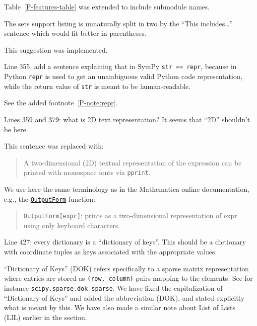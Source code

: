\documentclass[answers,12pt]{exam}
\begin{document}
\begin{questions}
\begin{solution}
Table~\ref{P-features-table} was extended to include submodule names.
\end{solution}

\question The sets support listing is unnaturally split in two by the ``This includes\ldots'' sentence which would fit better in parentheses.
\begin{solution}
This suggestion was implemented.
\end{solution}

\question Line 355, add a sentence explaining that in SymPy \texttt{str == repr}, because in Python \texttt{repr} is used to get an unambiguous valid Python code representation, while the return value of \texttt{str} is meant to be human-readable.
\begin{solution}
See the added footnote~\ref{P-note:repr}.
\end{solution}

\question Lines 359 and 379: what is 2D text representation? It seems that ``2D'' shouldn't be here.
\begin{solution}
This sentence was replaced with:
\begin{quote}
A two-dimensional (2D) textual representation of the expression can
be printed with monospace fonts via \verb|pprint|.
\end{quote}
We use here the same terminology as in the Mathematica
online documentation, e.g., the
\href{https://reference.wolfram.com/language/ref/OutputForm.html}{\texttt{OutputForm}}
function:
\begin{quote}
\texttt{OutputForm[expr]}: prints as a two-dimensional representation of expr using only keyboard characters.
\end{quote}
\end{solution}

\question Line 427: every dictionary is a ``dictionary of keys''. This should be a dictionary with coordinate tuples as keys associated with the appropriate values.
\begin{solution}
``Dictionary of Keys'' (DOK) refers specifically to a sparse matrix
representation where entries are stored as \texttt{(row, column)} pairs
mapping to the elements. See for instance \texttt{scipy.sparse.dok\_sparse}. We
have fixed the capitalization of ``Dictionary of Keys'' and added the
abbreviation (DOK), and stated explicitly what is meant by this. We have also
made a similar note about List of Lists (LIL) earlier in the section.
\end{solution}


\end{questions}
\end{document}
